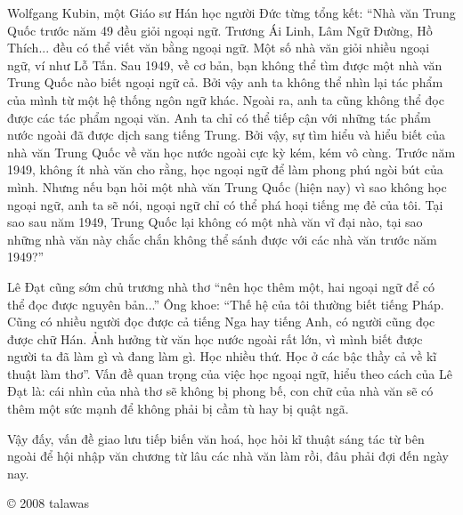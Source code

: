 \documentclass[../main.tex]{subfiles}
\begin{document}
\begin{multicols}{2}
Wolfgang Kubin, một Giáo sư Hán học người Đức từng tổng kết: “Nhà văn Trung Quốc trước năm 49 đều giỏi ngoại ngữ. Trương Ái Linh, Lâm Ngữ Đường, Hồ Thích... đều có thể viết văn bằng ngoại ngữ. Một số nhà văn giỏi nhiều ngoại ngữ, ví như Lỗ Tấn. Sau 1949, về cơ bản, bạn không thể tìm được một nhà văn Trung Quốc nào biết ngoại ngữ cả. Bởi vậy anh ta không thể nhìn lại tác phẩm của mình từ một hệ thống ngôn ngữ khác. Ngoài ra, anh ta cũng không thể đọc được các tác phẩm ngoại văn. Anh ta chỉ có thể tiếp cận với những tác phẩm nước ngoài đã được dịch sang tiếng Trung. Bởi vậy, sự tìm hiểu và hiểu biết của nhà văn Trung Quốc về văn học nước ngoài cực kỳ kém, kém vô cùng. Trước năm 1949, không ít nhà văn cho rằng, học ngoại ngữ để làm phong phú ngòi bút của mình. Nhưng nếu bạn hỏi một nhà văn Trung Quốc (hiện nay) vì sao không học ngoại ngữ, anh ta sẽ nói, ngoại ngữ chỉ có thể phá hoại tiếng mẹ đẻ của tôi. Tại sao sau năm 1949, Trung Quốc lại không có một nhà văn vĩ đại nào, tại sao những nhà văn này chắc chắn không thể sánh được với các nhà văn trước năm 1949?” 
 
Lê Đạt cũng sớm chủ trương nhà thơ “nên học thêm một, hai ngoại ngữ để có thể đọc được nguyên bản...” Ông khoe: “Thế hệ của tôi thường biết tiếng Pháp. Cũng có nhiều người đọc được cả tiếng Nga hay tiếng Anh, có người cũng đọc được chữ Hán. Ảnh hưởng từ văn học nước ngoài rất lớn, vì mình biết được người ta đã làm gì và đang làm gì. Học nhiều thứ. Học ở các bậc thầy cả về kĩ thuật làm thơ”. Vấn đề quan trọng của việc học ngoại ngữ, hiểu theo cách của Lê Đạt là: cái nhìn của nhà thơ sẽ không bị phong bế, con chữ của nhà văn sẽ có thêm một sức mạnh để không phải bị cầm tù hay bị quật ngã. 
 
Vậy đấy, vấn đề giao lưu tiếp biến văn hoá, học hỏi kĩ thuật sáng tác từ bên ngoài để hội nhập văn chương từ lâu các nhà văn làm rồi, đâu phải đợi đến ngày nay. 
 
© 2008 talawas



\end{multicols}
\end{document}
